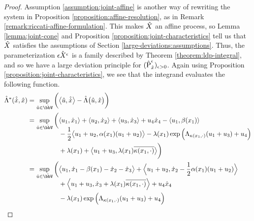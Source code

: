 \begin{proof}
  Assumption \ref{assumption:joint-affine} is another way of rewriting the system in Proposition \ref{proposition:affine-resolution}, as in Remark \ref{remark:riccati-affine-formulation}.
  This makes $\hat{X}$ an affine process, so Lemma \ref{lemma:joint-cone} and Proposition \ref{proposition:joint-characteristics} tell us that $\hat{X}$ satisfies the assumptions of Section \ref{large-deviations:assumptions}.
  Thus, the parameterization $\hat{\epsilon X^\epsilon}$ is a family described by Theorem \ref{theorem:ldp-integral}, and so we have a large deviation principle for $(\hat{{\operatorname{P}}}^\epsilon_{\hat{x}})_{\epsilon>0}$.
  Again using Proposition \ref{proposition:joint-characteristics}, we see that the integrand evaluates the following function.
  \begin{align}
    \notag
    \hat\ode^*(\hat{\diffVar}, \hat\stateVar) 
    &= \sup_{\hat\momentVar \in \hat\vecSpace} \bigg( \bprj{\hat\momentVar}{\hat\diffVar} - \hat\ode\big(\hat\momentVar, \hat\stateVar\big) \bigg) \\
    \notag
    &= \sup_{\hat\momentVar \in \hat\vecSpace} \bigg(\begin{aligned}[t]
      &\prj{\momentVar_1}{\diffVar_1} 
      + \prj{\momentVar_2}{\diffVar_2} 
      + \prj{\momentVar_3}{\diffVar_3} 
      + \momentVar_4\diffVar_4
      - \prj{\momentVar_1}{\affDrift(\stateVar_1)}  \\
      &- \frac12\bprj{\momentVar_1+\momentVar_2}{\affDiff(\stateVar_1)(\momentVar_1+\momentVar_2)} 
      - \affInt(\stateVar_1)\exp\Big(\ode_{\affDist(\stateVar_1,\cdot)}(\momentVar_1+\momentVar_3) + \momentVar_4\Big) \\
      &+ \affInt(\stateVar_1) 
      + \bprj{\momentVar_1+\momentVar_3}{\affInt(\stateVar_1)\overline{\affDist(\stateVar_1,\cdot)}}  \bigg) 
    \end{aligned} \\
    \label{eq:optimizing-integrand}
    &= \sup_{\hat\momentVar\in\hat\vecSpace} \bigg(\begin{aligned}[t]
      & \bprj{\momentVar_1}{\diffVar_1 - \affDrift(\stateVar_1) - \diffVar_2 - \diffVar_3} 
      + \Bprj{\momentVar_1+\momentVar_2}{\diffVar_2 
      - \frac12\affDiff(\stateVar_1)(\momentVar_1+\momentVar_2)} \\
      &+ \Bprj{\momentVar_1+\momentVar_3}{\diffVar_3 + \affInt(\stateVar_1)\overline{\affDist(\stateVar_1,\cdot)}} 
      + \momentVar_4\diffVar_4 \\
      &- \affInt(\stateVar_1) \exp\Big(\ode_{\affDist(\stateVar_1,\cdot)}(\momentVar_1+\momentVar_3) + \momentVar_4\Big)

\end{aligned}
\end{align}
\end{proof}
